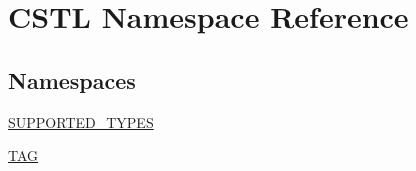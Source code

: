 \hypertarget{namespace_c_s_t_l}{}\section{C\+S\+TL Namespace Reference}
\label{namespace_c_s_t_l}
\subsection*{Namespaces}
\begin{DoxyCompactItemize}
\item 
 \hyperlink{namespace_c_s_t_l_1_1_s_u_p_p_o_r_t_e_d___t_y_p_e_s}{S\+U\+P\+P\+O\+R\+T\+E\+D\+\_\+\+T\+Y\+P\+ES}
\item 
 \hyperlink{namespace_c_s_t_l_1_1_t_a_g}{T\+AG}
\end{DoxyCompactItemize}
